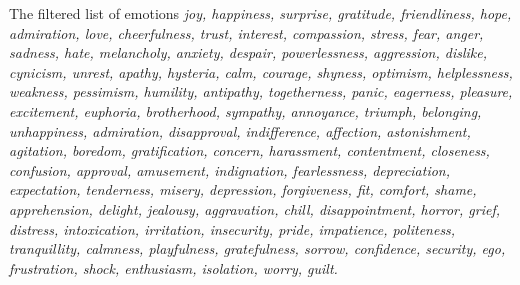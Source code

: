 \documentclass{llncs}
\begin{document}
The filtered list of emotions
\textit{joy, happiness, surprise, gratitude, friendliness, hope, admiration, love, cheerfulness, trust, interest,
compassion, stress, fear, anger, sadness, hate, melancholy, anxiety, despair, powerlessness, aggression, dislike, cynicism, unrest, apathy, hysteria, calm, courage, shyness, 
 optimism, helplessness, weakness, pessimism, humility, antipathy, 
 togetherness, panic, eagerness, pleasure, excitement, euphoria, brotherhood, sympathy, annoyance, triumph, belonging, unhappiness, admiration, disapproval, indifference, affection, astonishment, 
 agitation, boredom, gratification, concern, harassment, contentment, closeness, confusion, approval, amusement, indignation, fearlessness, depreciation, expectation, 
 tenderness, misery, depression, forgiveness, fit, comfort, shame, apprehension, delight, jealousy, aggravation, chill, disappointment, horror, grief, distress, intoxication,
 irritation, insecurity, pride, impatience, politeness, tranquillity, calmness, playfulness, gratefulness, sorrow, confidence, security, ego, frustration, shock, enthusiasm, isolation, worry, guilt.}
\end{document}

